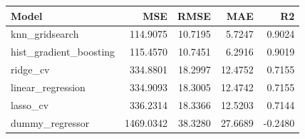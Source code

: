 \begin{tabular}{lrrrr}
\toprule
Model & MSE & RMSE & MAE & R2 \\
\midrule
knn\_gridsearch & 114.9075 & 10.7195 & 5.7247 & 0.9024 \\
hist\_gradient\_boosting & 115.4570 & 10.7451 & 6.2916 & 0.9019 \\
ridge\_cv & 334.8801 & 18.2997 & 12.4752 & 0.7155 \\
linear\_regression & 334.9093 & 18.3005 & 12.4742 & 0.7155 \\
lasso\_cv & 336.2314 & 18.3366 & 12.5203 & 0.7144 \\
dummy\_regressor & 1469.0342 & 38.3280 & 27.6689 & -0.2480 \\
\bottomrule
\end{tabular}
